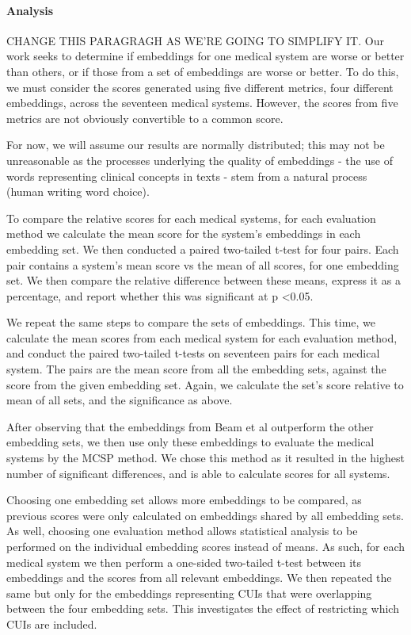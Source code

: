 \documentclass[11pt,a4paper]{article}
\def\red#1{{\color{red}#1}}
\begin{document}
\paragraph{Analysis}
\red{CHANGE THIS PARAGRAGH AS WE'RE GOING TO SIMPLIFY IT. }
Our work seeks to determine if embeddings for one medical system are worse or better than others, or if those from a set of embeddings are worse or better. To do this, we must consider the scores generated using five different metrics, four different embeddings, across the seventeen medical systems. However, the scores from five metrics are not obviously convertible to a common score.  

For now, we will assume our results are normally distributed; this may not be unreasonable as the processes underlying the quality of embeddings - the use of words representing clinical concepts in texts - stem from a natural process (human writing word choice).

To compare the relative scores for each medical systems, for each evaluation method we calculate the mean score for the system's embeddings in each embedding set. We then conducted a paired two-tailed t-test for four pairs. Each pair contains a system's mean score vs the mean of all scores, for one embedding set. We then compare the relative difference between these means, express it as a percentage, and report whether this was significant at p \textless 0.05. 

We repeat the same steps to compare the sets of embeddings. This time, we calculate the mean scores from each medical system for each evaluation method, and conduct the paired two-tailed t-tests on seventeen pairs for each medical system. The pairs are the mean score from all the embedding sets, against the score from the given embedding set. Again, we calculate the set's score relative to mean of all sets, and the significance as above. 

After observing that the embeddings from Beam et al outperform the other embedding sets, we then use only these embeddings to evaluate the medical systems by the MCSP method. We chose this method  as it resulted in the highest number of significant differences, and is able to calculate scores for all systems. 

Choosing one embedding set allows more embeddings to be compared, as previous scores were only calculated on embeddings shared by all embedding sets. As well, choosing one evaluation method  allows statistical analysis to be performed on the individual embedding scores instead of means. As such, for each medical system we then perform a one-sided two-tailed t-test between its embeddings and the scores from all relevant embeddings. We then repeated the same but only for the embeddings representing CUIs that were overlapping between the four embedding sets. This investigates the effect of restricting which CUIs are included.  
\end{document}

